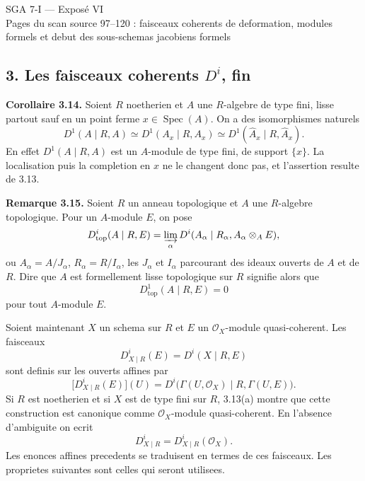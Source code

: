 \documentclass[11pt]{article}
\providecommand{\Spec}{\operatorname{Spec}}
\providecommand{\Aut}{\operatorname{Aut}}
\providecommand{\Spf}{\operatorname{Spf}}
\begin{document}
\providecommand{\Sing}{\operatorname{Sing}}
\providecommand{\Supp}{\operatorname{Supp}}
\providecommand{\depth}{\operatorname{depth}}
\providecommand{\Fitt}{\operatorname{Fitt}}
\providecommand{\Jac}{\operatorname{Jac}}
\providecommand{\sHom}{\mathcal Hom}
\providecommand{\RHom}{\operatorname{RHom}}
\providecommand{\Aut}{\operatorname{Aut}}
\providecommand{\Der}{\operatorname{Der}}
\providecommand{\Spf}{\operatorname{Spf}}
\providecommand{\cM}{\mathcal M}
\providecommand{\cB}{\mathcal B}
\providecommand{\cJ}{\mathcal J}
\providecommand{\cI}{\mathcal I}
\providecommand{\cL}{\mathcal L}
\providecommand{\cR}{\mathcal R}
\providecommand{\cT}{\mathcal T}
\providecommand{\cU}{\mathcal U}
\providecommand{\T}{\mathcal T}
\providecommand{\cV}{\mathcal V}
\providecommand{\kdual}{k[\varepsilon]}


\begin{center}
{\Large SGA 7-I — Exposé VI}\\[0.3em]
{\large Pages du scan source 97--120 : faisceaux coherents de deformation, modules formels et debut des sous-schemas jacobiens formels}
\end{center}

\subsection*{3. Les faisceaux coherents \(D^i\), fin}

\textbf{Corollaire 3.14.} Soient \(R\) noetherien et \(A\) une \(R\)-algebre de type fini, lisse partout sauf en un point ferme \(x\in\Spec(A)\). On a des isomorphismes naturels
\[
 D^1(A\mid R,A)\simeq D^1(A_x\mid R,A_x)
 \simeq D^1(\widehat A_x\mid R,\widehat A_x).
\]
En effet \(D^1(A\mid R,A)\) est un \(A\)-module de type fini, de support \(\{x\}\). La localisation puis la completion en \(x\) ne le changent donc pas, et l'assertion resulte de 3.13.

\textbf{Remarque 3.15.} Soient \(R\) un anneau topologique et \(A\) une \(R\)-algebre topologique. Pour un \(A\)-module \(E\), on pose
\[
 D^i_{\mathrm{top}}(A\mid R,E)=
 \varinjlim_{\alpha} D^i(A_\alpha\mid R_\alpha, A_\alpha\otimes_A E),
\]
ou \(A_\alpha=A/J_\alpha\), \(R_\alpha=R/I_\alpha\), les \(J_\alpha\) et \(I_\alpha\) parcourant des ideaux ouverts de \(A\) et de \(R\). Dire que \(A\) est formellement lisse topologique sur \(R\) signifie alors que
\[
 D^1_{\mathrm{top}}(A\mid R,E)=0
\]
pour tout \(A\)-module \(E\).

Soient maintenant \(X\) un schema sur \(R\) et \(E\) un \(\mathcal O_X\)-module quasi-coherent. Les faisceaux
\[
 D^i_{X\mid R}(E)=D^i(X\mid R,E)
\]
sont definis sur les ouverts affines par
\[
 \bigl[D^i_{X\mid R}(E)\bigr](U)=
 D^i\bigl(\Gamma(U,\mathcal O_X)\mid R,\Gamma(U,E)\bigr).
\]
Si \(R\) est noetherien et si \(X\) est de type fini sur \(R\), 3.13(a) montre que cette construction est canonique comme \(\mathcal O_X\)-module quasi-coherent. En l'absence d'ambiguite on ecrit
\[
 D^i_{X\mid R}=D^i_{X\mid R}(\mathcal O_X).
\]
Les enonces affines precedents se traduisent en termes de ces faisceaux. Les proprietes suivantes sont celles qui seront utilisees.
\end{document}
